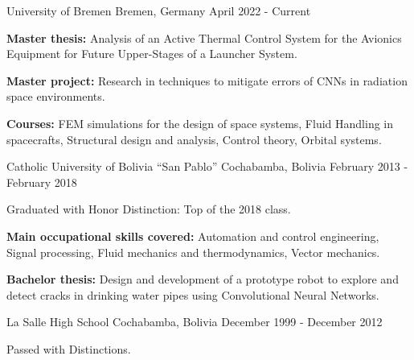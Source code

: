 

\begin{cventries}
  {University of Bremen}
  {Bremen, Germany}
  {April 2022 - Current}
  {
    \begin{cvitems}
      \item \textbf{Master thesis:} Analysis of an Active Thermal
      Control System for the Avionics Equipment for Future
      Upper-Stages of a Launcher System.
      \item \textbf{Master project:} Research in techniques to
      mitigate errors of CNNs in radiation space environments.
      \item \textbf{Courses:} FEM simulations for the design of space
      systems, Fluid Handling in spacecrafts, Structural design and
      analysis, Control theory, Orbital systems.
    \end{cvitems}
  }

  {Catholic University of Bolivia ``San Pablo''}
  {Cochabamba, Bolivia}
  {February 2013 - February 2018}
  {
    \begin{cvitems}
      \item Graduated with Honor Distinction: Top of the 2018 class.
      \item \textbf{Main occupational skills covered:} Automation and
      control engineering, Signal processing, Fluid mechanics and
      thermodynamics, Vector mechanics.
      \item \textbf{Bachelor thesis:} Design and development of a
      prototype robot to explore and detect cracks in drinking water
      pipes using Convolutional Neural Networks.
    \end{cvitems}
  }

  {La Salle High School}
  {Cochabamba, Bolivia}
  {December 1999 - December 2012}
  {
    \begin{cvitems}
      \item{Passed with Distinctions.}
    \end{cvitems}
  }

\end{cventries}
